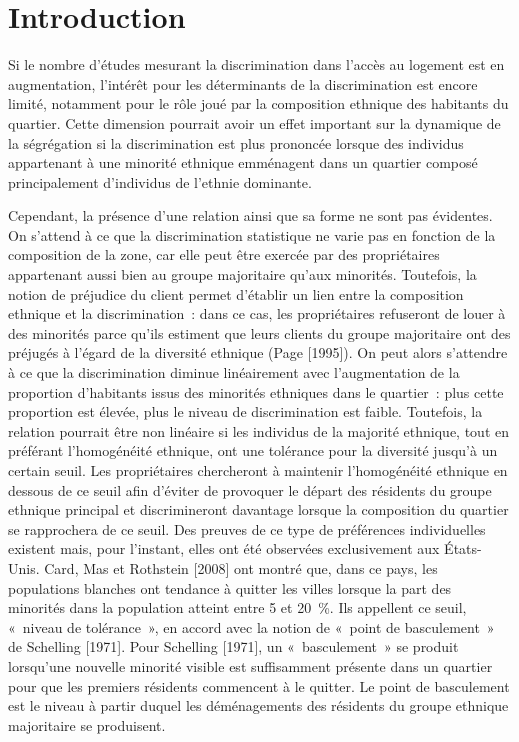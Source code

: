 \documentclass[10pt]{Revue-economique} %
\begin{document}

\section{Introduction}

Si le nombre d’études mesurant la discrimination dans l’accès au logement est en augmentation, l’intérêt pour les déterminants de la discrimination est encore limité, notamment pour le rôle joué par la composition ethnique des habitants du quartier. Cette dimension pourrait avoir un effet important sur la dynamique de la ségrégation si la discrimination est plus prononcée lorsque des individus appartenant à une minorité ethnique emménagent dans un quartier composé principalement d’individus de l’ethnie dominante.

Cependant, la présence d’une relation ainsi que sa forme ne sont pas évidentes. On s’attend à ce que la discrimination statistique ne varie pas en fonction de la composition de la zone, car elle peut être exercée par des propriétaires appartenant aussi bien au groupe majoritaire qu’aux minorités. Toutefois, la notion de préjudice du client permet d’établir un lien entre la composition ethnique et la discrimination : dans ce cas, les propriétaires refuseront de louer à des minorités parce qu’ils estiment que leurs clients du groupe majoritaire ont des préjugés à l’égard de la diversité ethnique (Page [1995]). On peut alors s’attendre à ce que la discrimination diminue linéairement avec l’augmentation de la proportion d’habitants issus des minorités ethniques dans le quartier : plus cette proportion est élevée, plus le niveau de discrimination est faible. Toutefois, la relation pourrait être non linéaire si les individus de la majorité ethnique, tout en préférant l’homogénéité ethnique, ont une tolérance pour la diversité jusqu’à un certain seuil. Les propriétaires chercheront à maintenir l’homogénéité ethnique en dessous de ce seuil afin d’éviter de provoquer le départ des résidents du groupe ethnique principal et discrimineront davantage lorsque la composition du quartier se rapprochera de ce seuil. Des preuves de ce type de préférences individuelles existent mais, pour l’instant, elles ont été observées exclusivement aux États-Unis. Card, Mas et Rothstein [2008] ont montré que, dans ce pays, les populations blanches ont tendance à quitter les villes lorsque la part des minorités dans la population atteint entre 5 et 20~\%. Ils appellent ce seuil, « niveau de tolérance », en accord avec la notion de « point de basculement » de Schelling [1971]. Pour Schelling [1971], un « basculement » se produit lorsqu’une nouvelle minorité visible est suffisamment présente dans un quartier pour que les premiers résidents commencent à le quitter. Le point de basculement est le niveau à partir duquel les déménagements des résidents du groupe ethnique majoritaire se produisent.
\end{document}
